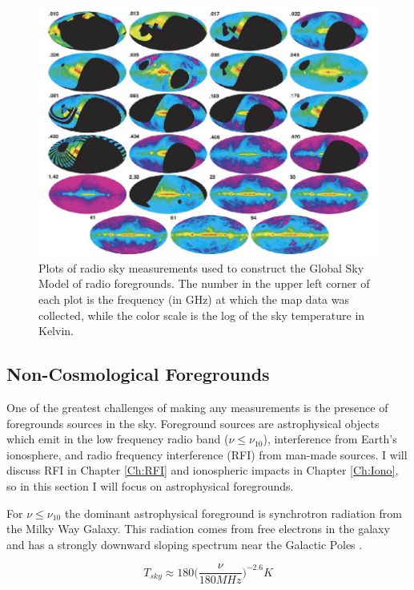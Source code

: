 \begin{figure}[htb]
\begin{center}
\includegraphics[width=0.95\linewidth]{Introduction/figures/GSM_maps.jpg}
\caption{Plots of radio sky measurements used to construct the Global Sky Model \cite{GSM_model} of radio foregrounds. The number in the upper left corner of each plot is the frequency (in GHz) at which the map data was collected, while the color scale is the log of the sky temperature in Kelvin.}
\label{Fig:GSM_maps}
\end{center}
\end{figure}


\subsection{Non-Cosmological Foregrounds}

One of the greatest challenges of making any \cm measurements is the presence of foregrounds sources in the sky. Foreground sources are astrophysical objects which emit in the low frequency radio band ($\nu \leq \nu_{10}$), interference from Earth's ionosphere, and radio frequency interference (RFI) from man-made sources. I will discuss RFI in Chapter \ref{Ch:RFI} and ionospheric impacts in Chapter \ref{Ch:Iono}, so in this section I will focus on astrophysical foregrounds. 

For $\nu \leq \nu_{10}$ the dominant astrophysical foreground is synchrotron radiation from the Milky Way Galaxy. This radiation comes from free electrons in the galaxy and has a strongly downward sloping spectrum near the Galactic Poles \cite{furlanetto_2006}. 

\begin{equation}\label{Eq:T_sky}
T_{sky} \approx 180 \Big( \frac{\nu}{180 MHz} \Big)^{-2.6} K
\end{equation}

